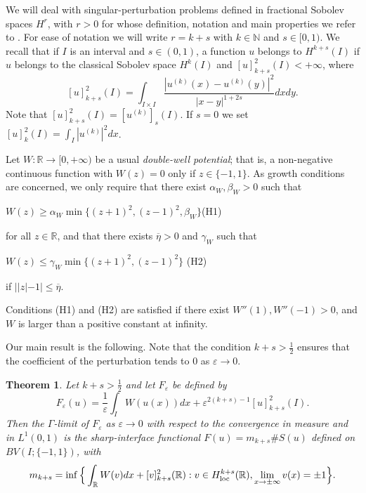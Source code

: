 \documentclass{article}
\newtheorem{theorem}[lemma]{Theorem}
\newcommand{\e}{\varepsilon}
\begin{document}
\smallskip
We will deal with singular-perturbation problems defined in fractional Sobo\-lev spaces $H^{r}$, with $r>0$ for whose definition, notation and main properties we refer to \cite{leofrac}. For ease of notation we will write $r=k+s$ with $k\in\mathbb N$ and $s\in[0,1)$. We recall that if $I$ is an interval and $s\in(0,1)$, a function $u$ belongs to $H^{k+s}(I)$ if $u$ belongs to the classical Sobolev space $H^k(I)$ and $[u]^2_{k+s}(I) <+\infty$, where
$$
[u]^2_{k+s}(I) = \int_{I\times I} \frac{|u^{(k)}(x)-u^{(k)}(y)|^2}{|x-y|^{1+2s}}dxdy.
$$
Note that $[u]^2_{k+s}(I)= [u^{(k)}]_s(I)$. If $s=0$ we set $[u]^2_k(I)=\int_I|u^{(k)}|^2dx$. 
\bigskip

Let $W\colon\mathbb R\to [0,+\infty)$ be a usual {\em double-well potential}; that is, a non-negative continuous function with $W(z)=0$ only if $z\in\{-1,1\}$.  As growth conditions are concerned, we only require that there exist $\alpha_W,\beta_W>0$ such that
\medskip 

\centerline{\hfill $W(z)\geq \alpha_W\min\{(z+1)^2,(z-1)^2, \beta_W\}$\hfill(H1) }

\medskip
\noindent  for all $z\in\mathbb R$, and that there exists $\overline \eta>0$ and $\gamma_W$ such that\medskip 

\centerline{\hfill $W(z)\le \gamma_W \min\{(z+1)^2,(z-1)^2\}$ \hfill(H2) }

\medskip\noindent  if $||z|-1|\le \overline \eta$.

Conditions (H1) and (H2) are satisfied if there exist $W''(1), W''(-1)>0$, and $W$ is larger than a positive constant at infinity.

\medskip
Our main result is the following. 
Note that the condition $k+s>\frac12$ ensures that the coefficient of the
perturbation tends to $0$ as $\e\to0$. 

\begin{theorem}\label{main} Let $k+s>\frac12$ and let $F_\e$ be defined by
$$
F_\e(u)=\frac1\e\int_I W(u(x))dx+\e^{2(k+s)-1}[u]^2_{k+s}(I).
$$
Then the $\Gamma$-limit of $F_\e$ as $\e\to 0$ with respect to the convergence in measure and in $L^1(0,1)$ is the sharp-interface functional
$F(u)= m_{k+s}\# S(u)$ defined on $BV(I;\{-1,1\})$, with
\begin{equation}\label{emme}
m_{k+s} =\inf\Big\{\int_{\mathbb R} W(v)dx+[v]^2_{k+s}(\mathbb R) : v\in H^{k+s}_{\rm loc}(\mathbb R), \lim_{x\to\pm\infty}v(x)=\pm1\Big\}.
\end{equation}
\end{theorem}
\end{document}

